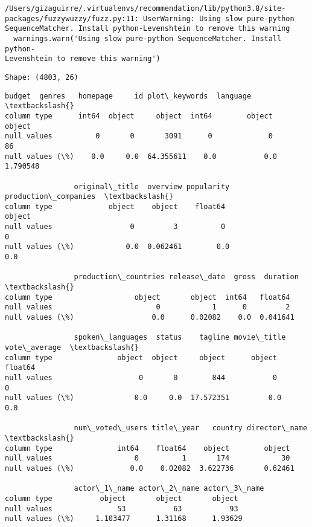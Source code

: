     \begin{Verbatim}[commandchars=\\\{\}]
/Users/gizaguirre/.virtualenvs/recommendation/lib/python3.8/site-
packages/fuzzywuzzy/fuzz.py:11: UserWarning: Using slow pure-python
SequenceMatcher. Install python-Levenshtein to remove this warning
  warnings.warn('Using slow pure-python SequenceMatcher. Install python-
Levenshtein to remove this warning')
    \end{Verbatim}

    \begin{Verbatim}[commandchars=\\\{\}]
Shape: (4803, 26)
    \end{Verbatim}

            \begin{tcolorbox}[breakable, size=fbox, boxrule=.5pt, pad at break*=1mm, opacityfill=0]
\begin{Verbatim}[commandchars=\\\{\}]
                budget  genres   homepage     id plot\_keywords  language  \textbackslash{}
column type      int64  object     object  int64        object    object
null values          0       0       3091      0             0        86
null values (\%)    0.0     0.0  64.355611    0.0           0.0  1.790548

                original\_title  overview popularity production\_companies  \textbackslash{}
column type             object    object    float64               object
null values                  0         3          0                    0
null values (\%)            0.0  0.062461        0.0                  0.0

                production\_countries release\_date  gross  duration  \textbackslash{}
column type                   object       object  int64   float64
null values                        0            1      0         2
null values (\%)                  0.0      0.02082    0.0  0.041641

                spoken\_languages  status    tagline movie\_title vote\_average  \textbackslash{}
column type               object  object     object      object      float64
null values                    0       0        844           0            0
null values (\%)              0.0     0.0  17.572351         0.0          0.0

                num\_voted\_users title\_year   country director\_name  \textbackslash{}
column type               int64    float64    object        object
null values                   0          1       174            30
null values (\%)             0.0    0.02082  3.622736       0.62461

                actor\_1\_name actor\_2\_name actor\_3\_name
column type           object       object       object
null values               53           63           93
null values (\%)     1.103477      1.31168      1.93629
\end{Verbatim}
\end{tcolorbox}
        
